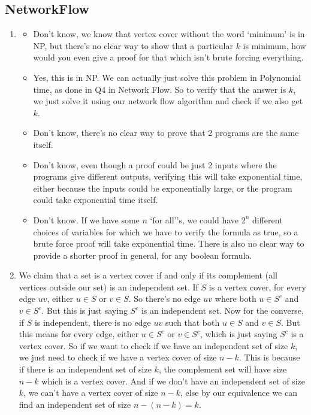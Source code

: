 \documentclass[12pt]{report}
\begin{document}
\subsection*{\Large\bfseries NetworkFlow}
\begin{enumerate}[label=\textbf{\arabic*.}]

    \item
    \begin{itemize}
        \item Don't know, we know that vertex cover without the word `minimum' is in NP, but there's no clear way to show that a particular
        $k$ is minimum, how would you even give a proof for that which isn't brute forcing everything.
        \item Yes, this is in NP. We can actually just solve this problem in Polynomial time, as done in Q4 in Network Flow. So to 
        verify that the answer is $k$, we just solve it using our network flow algorithm and check if we also get $k$.
        \item Don't know, there's no clear way to prove that 2 programs are the same itself.
        \item Don't know, even though a proof could be just 2 inputs where the programs give different outputs, verifying this will take
        exponential time, either because the inputs could be exponentially large, or the program could take exponential time itself.
        \item Don't know. If we have some $n$ `for all''s, we could have $2^n$ different choices of variables for which we have to verify 
        the formula as true, so a brute force proof will take exponential time. There is also no clear way to provide a shorter proof 
        in general, for any boolean formula.
    \end{itemize}

    \item We claim that a set is a vertex cover if and only if its complement (all vertices outside our set) is an independent set. If $S$
    is a vertex cover, for every edge $uv$, either $u \in S$ or $v \in S$. So there's no edge $uv$ where both $u \in S^c$ and $v \in S^c$. 
    But this is just saying $S^c$ is an independent set. Now for the converse, if $S$ is independent, there is no edge $uv$ such that 
    both $u \in S$ and $v \in S$. But this means for every edge, either $u \in S^c$ or $v \in S^c$, which is just saying $S^c$ is a vertex 
    cover. So if we want to check if we have an independent set of size $k$, we just need to check if we have a vertex cover of size $n-k$.
    This is because if there is an independent set of size $k$, the complement set will have size $n-k$ which is a vertex cover. And if we
    don't have an independent set of size $k$, we can't have a vertex cover of size $n-k$, else by our equivalence we can find an independent 
    set of size $n - (n-k) = k$.
    

\end{enumerate}
\end{document}
